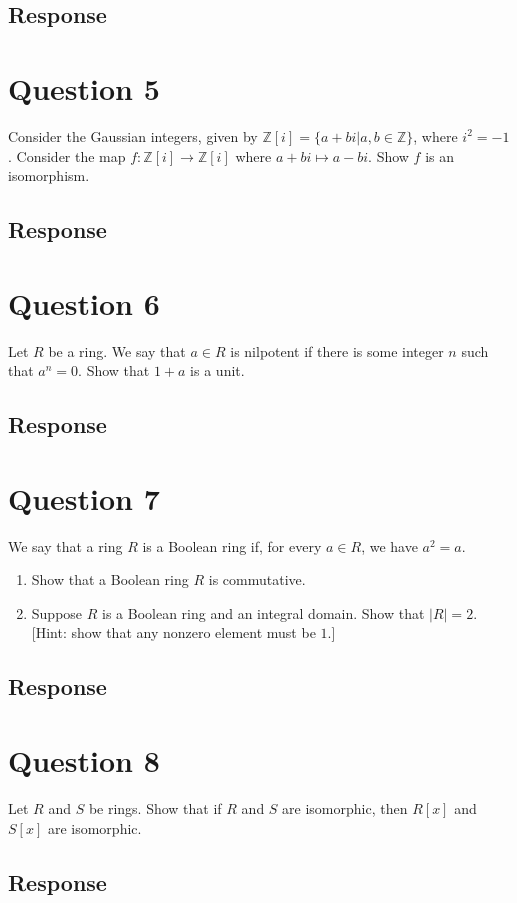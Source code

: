 \documentclass [12pt] {article}
\newcommand{\Z}{\mathbb{Z}}
\begin{document}
\subsection*{Response}
\newpage

\section*{Question 5}
Consider the Gaussian integers, given by $\Z[i]=\{a+bi|a,b\in\Z\}$, where $i^2=-1$. Consider the map $f:\Z[i]\to \Z[i]$ where $a+bi\mapsto a-bi$. Show $f$ is an isomorphism.
\subsection*{Response}
\newpage

\section*{Question 6}
Let $R$ be a ring. We say that $a\in R$ is nilpotent if there is some integer $n$ such that $a^n=0$. 
Show that $1+a$ is a unit. 
\subsection*{Response}
\newpage

\section*{Question 7}
We say that a ring $R$ is a Boolean ring if, for every $a\in R$, we have $a^2=a$. 

\begin{enumerate}
    \item Show that a Boolean ring $R$ is commutative.
    \item Suppose $R$ is a Boolean ring and an integral domain. Show that $|R|=2$. [Hint: show that any nonzero element must be $1$.]
\end{enumerate} 
\subsection*{Response}
\newpage

\section*{Question 8}
Let $R$ and $S$ be rings. Show that if $R$ and $S$ are isomorphic, then $R[x]$ and $S[x]$ are isomorphic. 
\subsection*{Response}
\newpage
\end{document}
